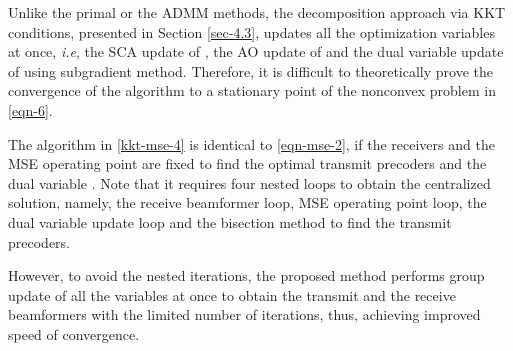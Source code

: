 Unlike the primal or the \ac{ADMM} methods, the decomposition approach via \ac{KKT} conditions, presented in Section \ref{sec-4.3}, updates all the optimization variables at once, \textit{i.e}, the \ac{SCA} update of , the \ac{AO} update of  and the dual variable update of \me{\alpha} using subgradient method. Therefore, it is difficult to theoretically prove the convergence of the algorithm to a stationary point of the nonconvex problem in \eqref{eqn-6}.

The algorithm in \eqref{kkt-mse-4} is identical to \eqref{eqn-mse-2}, if the receivers  and the \ac{MSE} operating point  are fixed to find the optimal transmit precoders  and the dual variable . Note that it requires four nested loops to obtain the centralized solution, namely, the receive beamformer loop, \ac{MSE} operating point loop, the dual variable update loop and the bisection method to find the transmit precoders. 

However, to avoid the nested iterations, the proposed method performs group update of all the variables at once to obtain the transmit and the receive beamformers with the limited number of iterations, thus, achieving improved speed of convergence.  

